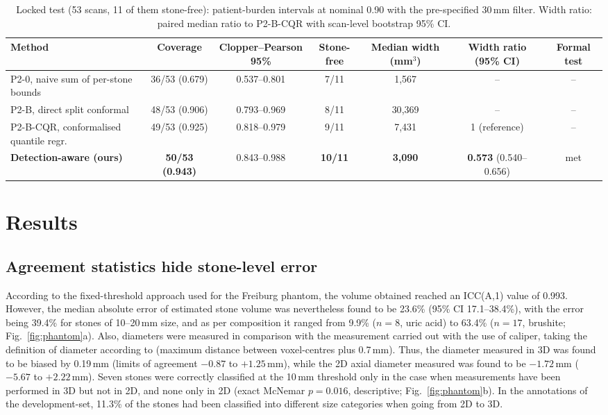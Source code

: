 \documentclass[conference]{IEEEtran}
\begin{document}
\begin{table}[t]
\caption{Locked test (53 scans, 11 of them stone-free): patient-burden intervals at nominal 0.90 with the pre-specified 30\,mm filter. Width ratio: paired median ratio to P2-B-CQR with scan-level bootstrap 95\% CI.}
\label{tab:t1}
\centering\footnotesize
\setlength{\tabcolsep}{3.5pt}
\begin{tabular}{lcccccc}
\toprule
Method & Coverage & Clopper--Pearson 95\% & Stone-free & Median width (mm$^3$) & Width ratio (95\% CI) & Formal test \\
\midrule
P2-0, naive sum of per-stone bounds & 36/53 (0.679) & 0.537--0.801 & 7/11 & 1{,}567 & -- & -- \\
P2-B, direct split conformal & 48/53 (0.906) & 0.793--0.969 & 8/11 & 30{,}369 & -- & -- \\
P2-B-CQR, conformalised quantile regr. & 49/53 (0.925) & 0.818--0.979 & 9/11 & 7{,}431 & 1 (reference) & -- \\
\textbf{Detection-aware (ours)} & \textbf{50/53 (0.943)} & 0.843--0.988 & \textbf{10/11} & \textbf{3{,}090} & \textbf{0.573} (0.540--0.656) & met \\
\bottomrule
\end{tabular}
\end{table}

\section{Results}
\subsection{Agreement statistics hide stone-level error}\label{sec:res_phantom}
According to the fixed-threshold approach \cite{neubauer2023} used for the Freiburg phantom, the volume obtained reached an ICC(A,1) value of 0.993. However, the median absolute error of estimated stone volume was nevertheless found to be 23.6\% (95\% CI 17.1--38.4\%), with the error being 39.4\% for stones of 10--20\,mm size, and as per composition it ranged from 9.9\% ($n = 8$, uric acid) to 63.4\% ($n = 17$, brushite; Fig.~\ref{fig:phantom}a). Also, diameters were measured in comparison with the measurement carried out with the use of caliper, taking the definition of diameter according to \cite{neubauer2023} (maximum distance between voxel-centres plus 0.7\,mm). Thus, the diameter measured in 3D was found to be biased by 0.19\,mm (limits of agreement $-0.87$ to $+1.25$\,mm), while the 2D axial diameter measured was found to be $-1.72$\,mm ($-5.67$ to $+2.22$\,mm). Seven stones were correctly classified at the 10\,mm threshold only in the case when measurements have been performed in 3D but not in 2D, and none only in 2D (exact McNemar $p = 0.016$, descriptive; Fig.~\ref{fig:phantom}b). In the annotations of the development-set, 11.3\% of the stones had been classified into different size categories when going from 2D to 3D.
\end{document}
